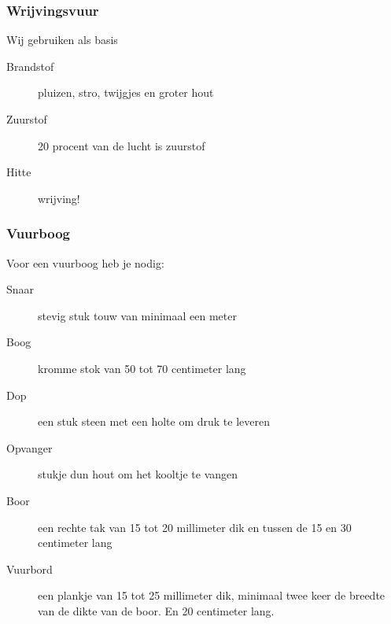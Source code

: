 \documentclass[a4paper, handout]{beamer}
\begin{document}
\begin{frame}
	\frametitle{Wrijvingsvuur}
	Wij gebruiken als basis	
	\begin{description}
		\item[Brandstof] pluizen, stro, twijgjes en groter hout
		\item[Zuurstof] 20 procent van de lucht is zuurstof
		\item[Hitte] wrijving!
	\end{description}
\end{frame}

\begin{frame}
	\frametitle{Vuurboog}
	Voor een vuurboog heb je nodig:
	
	\begin{description}
		\item[Snaar] stevig stuk touw van minimaal een meter
		\item[Boog] kromme stok van 50 tot 70 centimeter lang
		\item[Dop] een stuk steen met een holte om druk te leveren
		\item[Opvanger] stukje dun hout om het kooltje te vangen
		\item[Boor] een rechte tak van 15 tot 20 millimeter dik en tussen de 15 en 30 centimeter lang
		\item[Vuurbord] een plankje van 15 tot 25 millimeter dik, minimaal twee keer de breedte van de dikte van de boor. En 20 centimeter lang.
	\end{description}
\end{frame}
\end{document}
